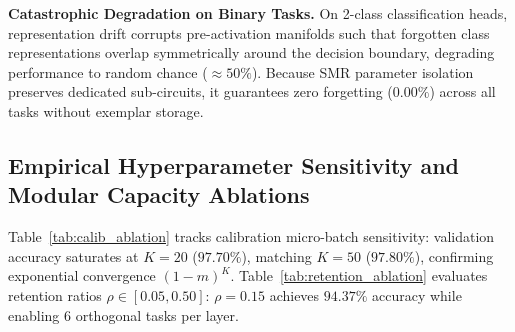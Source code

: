 \documentclass{article}
\begin{document}
\begin{table}[ht]
\centering
\caption{\textbf{Empirical per-task accuracy matrices for Task-IL} across baseline ablation configurations. Each entry is the final-step evaluation $A_{T,i}$ over the task-masked heads, exactly as recorded on disk (3 seeds).}
\label{tab:per_task_matrices}
\vskip 0.02in
\renewcommand{\arraystretch}{0.80}
\end{table}

\noindent\textbf{Catastrophic Degradation on Binary Tasks.} On 2-class classification heads, representation drift corrupts pre-activation manifolds such that forgotten class representations overlap symmetrically around the decision boundary, degrading performance to random chance ($\approx 50\%$). Because SMR parameter isolation preserves dedicated sub-circuits, it guarantees zero forgetting ($0.00\%$) across all tasks without exemplar storage.

\subsection{Empirical Hyperparameter Sensitivity and Modular Capacity Ablations}
\label{sec:app_ablations}
\label{sec:app_calib_ablation}
\label{sec:app_retention_ablation}
\label{sec:app_dsmr_validation}
Table~\ref{tab:calib_ablation} tracks calibration micro-batch sensitivity: validation accuracy saturates at $K=20$ ($97.70\%$), matching $K=50$ ($97.80\%$), confirming exponential convergence $(1-m)^K$. Table~\ref{tab:retention_ablation} evaluates retention ratios $\rho \in [0.05, 0.50]$: $\rho = 0.15$ achieves $94.37\%$ accuracy while enabling 6 orthogonal tasks per layer.
\end{document}

